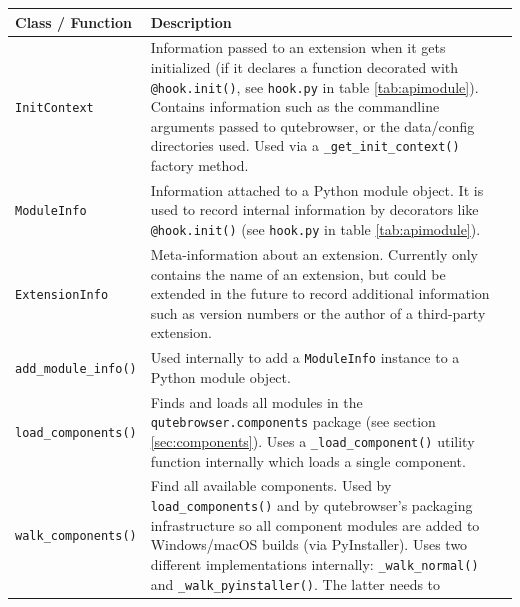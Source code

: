 \documentclass[a4paper,parskip=full,DIV=14,BCOR=15mm]{scrreprt}
\newcommand{\py}[1]{\texttt{#1}}
\begin{document}
\begin{table}[H]
  \centering
  \begin{tabulary}{\linewidth}{lL}
    \toprule
    Class / Function & Description \\
    \midrule
    \verb|InitContext| & Information passed to an extension when it gets
                         initialized (if it declares a function decorated with
                         \py{@hook.init()}, see \verb|hook.py| in table
                         \ref{tab:apimodule}). Contains information such as the
                         commandline arguments passed to qutebrowser, or the
                         data/config directories used. Used via a
                         \verb|_get_init_context()| factory method.\\
    \verb|ModuleInfo| & Information attached to a Python module object. It is
                        used to record internal information by decorators like
                        \py{@hook.init()} (see \verb|hook.py| in table
                        \ref{tab:apimodule}). \\
    \verb|ExtensionInfo| & Meta-information about an extension. Currently only
                           contains the name of an extension, but could be
                           extended in the future to record additional
                           information such as version numbers or the author of
                           a third-party extension. \\
    \verb|add_module_info()| & Used internally to add a \verb|ModuleInfo|
                               instance to a Python module object. \\
    \verb|load_components()| & Finds and loads all modules in the
                               \verb|qutebrowser.components| package (see
                               section \ref{sec:components}). Uses a
                               \verb|_load_component()| utility function
                               internally which loads a single component. \\
    \verb|walk_components()| & Find all available components. Used by
                               \verb|load_components()| and by qutebrowser's
                               packaging infrastructure so all component modules
                               are added to Windows/macOS builds (via
                               PyInstaller). Uses two different implementations
                               internally: \verb|_walk_normal()| and
                               \verb|_walk_pyinstaller()|. The latter needs to

\end{tabulary}
\end{table}
\end{document}
